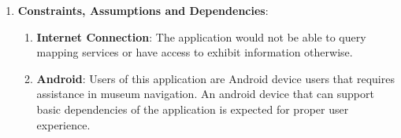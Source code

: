 \begin{enumerate}

    \item \textbf{Constraints, Assumptions and Dependencies}:
    \begin{enumerate}
        \item \textbf{Internet Connection}: The application would not be able to query mapping services or have access to exhibit information otherwise.
        \item \textbf{Android}: Users of this application are Android device users that requires assistance in museum navigation. An android device that can support basic dependencies of the application is expected for proper user experience.
    \end{enumerate}
    
\end{enumerate}